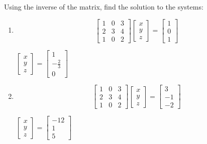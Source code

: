 \documentclass{ximera}
\begin{document}
\begin{problem}\label{prb:4.45}Using the inverse of the matrix, find the solution to the systems:

\begin{enumerate}
\item
\begin{equation*}
\left[
\begin{array}{rrr}
1 & 0 & 3 \\
2 & 3 & 4 \\
1 & 0 & 2
\end{array}
\right] \left[
\begin{array}{c}
x \\
y \\
z
\end{array}
\right] =\left[
\begin{array}{r}
1 \\
0 \\
1
\end{array}
\right]
\end{equation*}
\begin{hint}
$\left[
\begin{array}{c}
x \\
y \\
z
\end{array}
\right] =\left[
\begin{array}{c}
1 \\
- \frac{2}{3} \\
0
\end{array}
\right]$
\end{hint}

\item
\begin{equation*}
\left[
\begin{array}{rrr}
1 & 0 & 3 \\
2 & 3 & 4 \\
1 & 0 & 2
\end{array}
\right] \left[
\begin{array}{c}
x \\
y \\
z
\end{array}
\right] =\left[
\begin{array}{r}
3 \\
-1 \\
-2
\end{array}
\right]
\end{equation*}

\begin{hint}
$\left[
\begin{array}{c}
x \\
y \\
z
\end{array}
\right] = \left[
\begin{array}{r}
-12 \\
1 \\
5
\end{array}
\right]$
\end{hint}
\end{enumerate}


\end{problem}
\end{document}
